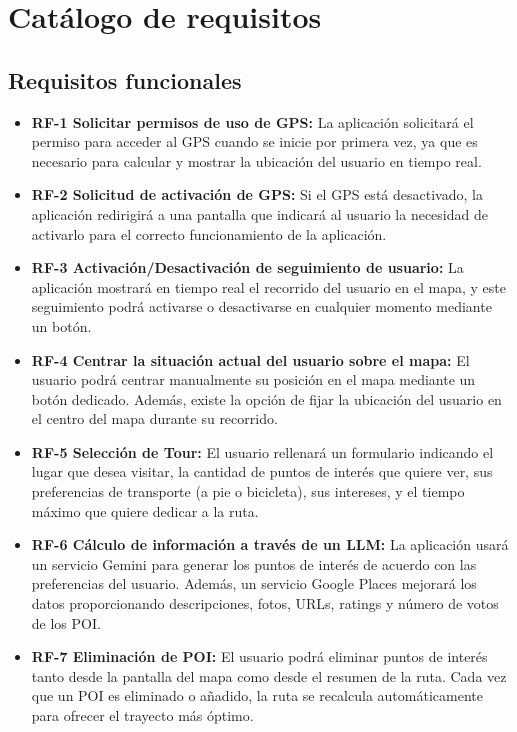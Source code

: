 \section{Catálogo de requisitos}
\subsection{Requisitos funcionales}
\begin{itemize}
	\item \textbf{RF-1 Solicitar permisos de uso de GPS:} La aplicación solicitará el permiso para acceder al GPS cuando se inicie por primera vez, ya que es necesario para calcular y mostrar la ubicación del usuario en tiempo real.
	
	\item \textbf{RF-2 Solicitud de activación de GPS:} Si el GPS está desactivado, la aplicación redirigirá a una pantalla que indicará al usuario la necesidad de activarlo para el correcto funcionamiento de la aplicación.
	
	\item \textbf{RF-3 Activación/Desactivación de seguimiento de usuario:} La aplicación mostrará en tiempo real el recorrido del usuario en el mapa, y este seguimiento podrá activarse o desactivarse en cualquier momento mediante un botón.
	
	\item \textbf{RF-4 Centrar la situación actual del usuario sobre el mapa:} El usuario podrá centrar manualmente su posición en el mapa mediante un botón dedicado. Además, existe la opción de fijar la ubicación del usuario en el centro del mapa durante su recorrido.
	
	\item \textbf{RF-5 Selección de Tour:} El usuario rellenará un formulario indicando el lugar que desea visitar, la cantidad de puntos de interés que quiere ver, sus preferencias de transporte (a pie o bicicleta), sus intereses, y el tiempo máximo que quiere dedicar a la ruta.
	
	\item \textbf{RF-6 Cálculo de información a través de un LLM:} La aplicación usará un servicio Gemini para generar los puntos de interés de acuerdo con las preferencias del usuario. Además, un servicio Google Places mejorará los datos proporcionando descripciones, fotos, URLs, ratings y número de votos de los POI.
	
	\item \textbf{RF-7 Eliminación de POI:} El usuario podrá eliminar puntos de interés tanto desde la pantalla del mapa como desde el resumen de la ruta. Cada vez que un POI es eliminado o añadido, la ruta se recalcula automáticamente para ofrecer el trayecto más óptimo.
	

\end{itemize}
